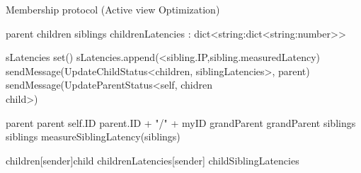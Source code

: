 \begin{algorithm}
    \caption{Membership protocol (Active view Optimization)} \label{alg:memb:active_view_maint}
    \begin{algorithmic}[1]
        \asdstate
            \State parent  \label{alg:memb:active_view_maint:state_start}
            \State children  
            \State siblings  
            \State childrenLatencies : dict<string:dict<string:number>> \label{alg:memb:active_view_maint:state_end} 
        \asdend

         \label{alg:memb:active_view_maint:update}
                \State sLatencies \asdassign set()
                    \State sLatencies.append(<sibling.IP,sibling.measuredLatency)
                \EndFor
                \State sendMessage(UpdateChildStatus<children, siblingLatencies>, parent)
            \EndIf
                \State sendMessage(UpdateParentStatus<self, chidren \\ child>)
            \EndFor
        \asdend \label{alg:memb:active_view_maint:update_end}

        \label{alg:memb:active_view_maint:update_recv_par}
                \State parent \asdassign parent
                \State self.ID \asdassign parent.ID + "/" + myID
                \State grandParent \asdassign grandParent
                \State siblings \asdassign siblings
                \State measureSiblingLatency(siblings)
            \EndIf
        \asdend

        \label{alg:memb:active_view_maint:update_recv_chi}
                \State children[sender]\asdassign child
                \State childrenLatencies[sender] \asdassign childSiblingLatencies
            \EndIf
        \asdend
    
    

\end{algorithmic}
\end{algorithm}
